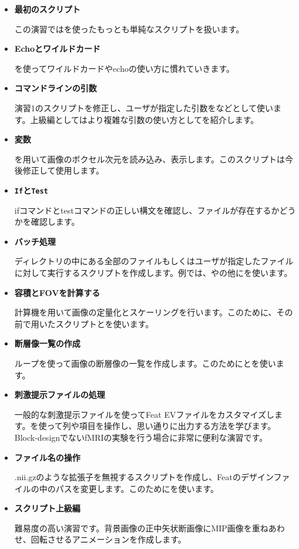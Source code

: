 \documentclass{jsarticle}
\begin{document}
\begin{itemize}

\item {\bf 最初のスクリプト}

この演習では{\color{red}}を使ったもっとも単純なスクリプトを扱います。

\item {\bf Echoとワイルドカード}

{\color{red}}を使ってワイルドカードやechoの使い方に慣れていきます。

\item {\bf コマンドラインの引数}

演習1のスクリプトを修正し、ユーザが指定した引数を{\color{red}{\tt \$1}}などとして使います。上級編としてはより複雑な引数の使い方として{\color{red}}を紹介します。

\item {\bf 変数}

{\color{red}}を用いて画像のボクセル次元を読み込み、表示します。このスクリプトは今後修正して使用します。

\item {\bf {\tt If}と{\tt Test}}

ifコマンドとtestコマンドの正しい構文を確認し、ファイルが存在するかどうかを確認します。

\item {\bf バッチ処理}

ディレクトリの中にある全部のファイルもしくはユーザが指定したファイルに対して実行するスクリプトを作成します。例では、{\color{red}}や{\color{red}}の他に{\color{red}}を使います。

\item {\bf 容積とFOVを計算する}

計算機{\color{red}}を用いて画像の定量化とスケーリングを行います。このために、その前で用いたスクリプトと{\color{red}}を使います。

\item {\bf 断層像一覧の作成}

ループを使って画像の断層像の一覧を作成します。このために{\color{red}}と{\color{red}}を使います。

\item {\bf 刺激提示ファイルの処理}

一般的な刺激提示ファイルを使ってFeat EVファイルをカスタマイズします。{\color{red}}を使って列や項目を操作し、思い通りに出力する方法を学びます。Block-designでないfMRIの実験を行う場合に非常に便利な演習です。

\item {\bf ファイル名の操作}

.nii.gzのような拡張子を無視するスクリプトを作成し、Featのデザインファイルの中のパスを変更します。このために{\color{red}}を使います。

\item {\bf スクリプト上級編}

難易度の高い演習です。背景画像の正中矢状断画像にMIP画像を重ねあわせ、回転させるアニメーションを作成します。

\end{itemize}
\end{document}
